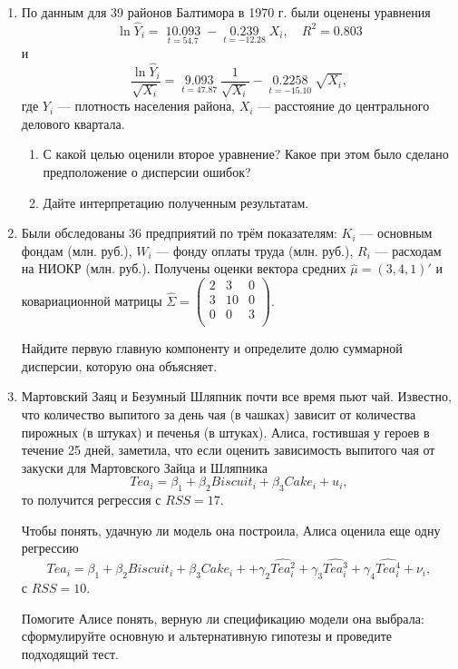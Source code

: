 \documentclass[12pt, a4paper]{article}\usepackage[]{graphicx}\usepackage[]{color}
\begin{document}
\begin{enumerate}

\item По данным для 39 районов Балтимора в 1970 г. были оценены уравнения
\[\ln {\hat Y_i} = \mathop {10.093}\limits_{t = 54.7}  - \mathop {0.239}\limits_{t =  - 12.28} {X_i},\quad {R^2} = 0.803\]
и
\[\frac{{\ln {{\hat Y}_i}}}{{\sqrt {{X_i}} }} = \mathop {9.093}\limits_{t = 47.87} \frac{1}{{\sqrt {{X_i}} }} - \mathop {0.2258}\limits_{t =  - 15.10} \sqrt {{X_i}} ,\]
где $Y_i$ — плотность населения района, $X_i$ — расстояние до центрального делового квартала.

\begin{enumerate}
\item С какой целью оценили второе уравнение? Какое при этом было сделано предположение о дисперсии ошибок?
\item Дайте интерпретацию полученным результатам.
\end{enumerate}

\item Были обследованы 36 предприятий по трём показателям:  $K_i$ — основным фондам (млн. руб.), $W_i$ — фонду оплаты труда (млн. руб.), $R_i$ — расходам на НИОКР (млн. руб.). Получены оценки вектора средних $\hat \mu = (3, 4, 1)'$ и ковариационной матрицы  $\hat\Sigma = \begin{pmatrix}
2 & 3 & 0 \\
3 & 10 & 0 \\
0 & 0 & 3 \\
\end{pmatrix}
$.

Найдите первую главную компоненту и определите долю суммарной дисперсии, которую она объясняет.

\item Мартовский Заяц и Безумный Шляпник почти все время пьют чай. Известно, что количество выпитого за день чая (в чашках) зависит от количества пирожных (в штуках) и печенья (в штуках). Алиса, гостившая у героев в течение 25 дней, заметила, что если оценить зависимость выпитого чая от закуски для Мартовского Зайца и Шляпника
\[
Tea_i = \beta_1 + \beta_2 Biscuit_i + \beta_3 Cake_i + u_i,
\]
то получится регрессия с $RSS = 17$.

Чтобы понять, удачную ли модель она построила, Алиса оценила еще одну регрессию
\[
Tea_i = \beta_1 + \beta_2 Biscuit_i + \beta_3 Cake_i +
   +\gamma_2 \widehat{Tea_i^2} +\gamma_3 \widehat{Tea_i^3} +\gamma_4 \widehat{Tea_i^4} + \nu_i,
\]
с $RSS = 10$.

Помогите Алисе понять, верную ли спецификацию модели она выбрала: сформулируйте основную и альтернативную гипотезы и проведите подходящий тест.



\end{enumerate}
\end{document}
